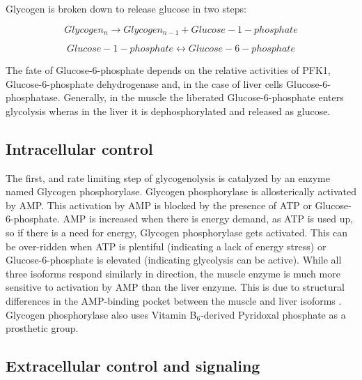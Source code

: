 \documentclass{tufte-handout}
\begin{document}
Glycogen is broken down to release glucose in two steps:

\begin{equation}
Glycogen_{n} \rightarrow Glycogen_{n-1} + Glucose-1-phosphate
\end{equation}

\begin{equation}
Glucose-1-phosphate \leftrightarrow Glucose-6-phosphate
\end{equation}

The fate of Glucose-6-phosphate depends on the relative activities of PFK1, Glucose-6-phosphate dehydrogenase and, in the case of liver cells Glucose-6-phosphatase.  Generally, in the muscle the liberated Glucose-6-phosphate enters glycolysis wheras in the liver it is dephosphorylated and released as glucose.

\subsection{Intracellular control}

The first, and rate limiting step of glycogenolysis is catalyzed by an enzyme named Glycogen phosphorylase.  Glycogen phosphorylase is allosterically activated by AMP.  This activation by AMP is blocked by the presence of ATP or Glucose-6-phosphate.  AMP is increased when there is energy demand, as ATP is used up, so if there is a need for energy, Glycogen phosphorylase gets activated.  This can be over-ridden when ATP is plentiful (indicating a lack of energy stress) or Glucose-6-phosphate is elevated (indicating glycolysis can be active).  While all three isoforms respond similarly in direction, the muscle enzyme is much more sensitive to activation by AMP than the liver enzyme.  This is due to structural differences in the AMP-binding pocket between the muscle and liver isoforms \citep{Rath2000}.  Glycogen phosphorylase also uses Vitamin B$_6$-derived Pyridoxal phosphate as a prosthetic group.

\subsection{Extracellular control and signaling}
\end{document}
